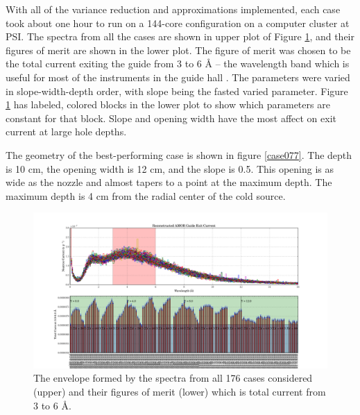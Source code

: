 \documentclass[a4paper]{jpconf}
\begin{document}
With all of the variance reduction and approximations implemented, each case took about one hour to run on a 144-core configuration on a computer cluster at PSI.  The spectra from all the cases are shown in upper plot of Figure \ref{parametric_REH}, and their figures of merit are shown in the lower plot.  The figure of merit was chosen to be the total current exiting the guide from 3 to 6 \AA{} -- the wavelength band which is useful for most of the instruments in the guide hall \cite{intruments_wavelength}.  The parameters were varied in slope-width-depth order, with slope being the fasted varied parameter. Figure \ref{parametric_REH} has labeled, colored blocks in the lower plot to show which parameters are constant for that block.  Slope and opening width have the most affect on exit current at large hole depths.

The geometry of the best-performing case is shown in figure \ref{case077}.  The depth is 10 cm, the opening width is 12 cm, and the slope is 0.5.  This opening is as wide as the nozzle and almost tapers to a point at the maximum depth.  The maximum depth is 4 cm from the radial center of the cold source.  

\begin{figure}
\begin{center}
\includegraphics[scale=0.38,trim={1cm 2.35cm 1cm 0cm},clip]{graphics/parametric_REH.pdf}
\end{center}
\caption{\label{parametric_REH}The envelope formed by the spectra from all 176 cases considered (upper) and their figures of merit (lower) which is total current from 3 to 6 \AA{}.}
\end{figure}
\end{document}

